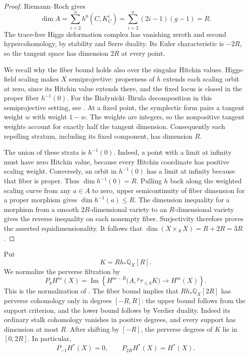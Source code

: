 \begin{proof}
Riemann--Roch gives
\[
 \dim A=\sum_{i=2}^n h^0(C,K_C^i)
 =\sum_{i=2}^n(2i-1)(g-1)=R.
\]
The trace-free Higgs deformation complex has vanishing zeroth and second
hypercohomology, by stability and Serre duality.  Its Euler characteristic
is $-2R$, so the tangent space has dimension $2R$ at every point.

We recall why the fiber bound holds also over the singular Hitchin values.
Higgs-field scaling makes $X$ semiprojective: properness of $h$ extends
each scaling orbit at zero, since its Hitchin value extends there, and
the fixed locus is closed in the proper fiber $h^{-1}(0)$.
For the Bia\l{}ynicki--Birula decomposition \cite{BialynickiBirula1973}
in this semiprojective setting, see \cite[Section~1.2]{HRV2015}.
At a fixed point, the symplectic form pairs a tangent weight $w$ with
weight $1-w$.  The weights are integers, so the nonpositive tangent
weights account for exactly half the tangent dimension.  Consequently
each repelling stratum, including its fixed component, has dimension
$R$.

The union of these strata is $h^{-1}(0)$.  Indeed, a point with a limit
at infinity must have zero Hitchin value, because every Hitchin coordinate
has positive scaling weight.  Conversely, an orbit in $h^{-1}(0)$ has a
limit at infinity because that fiber is proper.  Thus
$\dim h^{-1}(0)=R$.  Pulling $h$ back along the weighted scaling curve
from any $a\in A$ to zero, upper semicontinuity of fiber dimension for a
proper morphism gives $\dim h^{-1}(a)\le R$.  The dimension inequality
for a morphism from a smooth $2R$-dimensional variety to an
$R$-dimensional variety gives the reverse inequality on each nonempty
fiber.  Surjectivity therefore proves the asserted equidimensionality.
It follows that $\dim(X\times_A X)=R+2R=3R$.
\end{proof}

Put
\[
 K=Rh_*\mathbb Q_X[R].
\]
We normalize the perverse filtration by
\begin{equation}\label{norm:perverse-filtration}
 P_kH^m(X)=\operatorname{Im}\left\{
 H^{m-R}\bigl(A,{}^p\tau_{\le k}K\bigr)
 \longrightarrow H^m(X)\right\}.
\end{equation}
This is the normalization of \cite[Section~1.1]{MS2024}.
The fiber bound implies that $Rh_*\mathbb Q_X[2R]$ has perverse
cohomology only in degrees $[-R,R]$: the upper bound follows from the
support criterion, and the lower bound follows by Verdier duality.
Indeed its ordinary stalk cohomology vanishes in positive degrees,
and every support has dimension at most $R$.
After shifting by $[-R]$, the perverse degrees of $K$ lie in $[0,2R]$.
In particular,
\begin{equation}\label{norm:perverse-range}
 P_{-1}H^*(X)=0,\qquad P_{2R}H^*(X)=H^*(X).
\end{equation}

